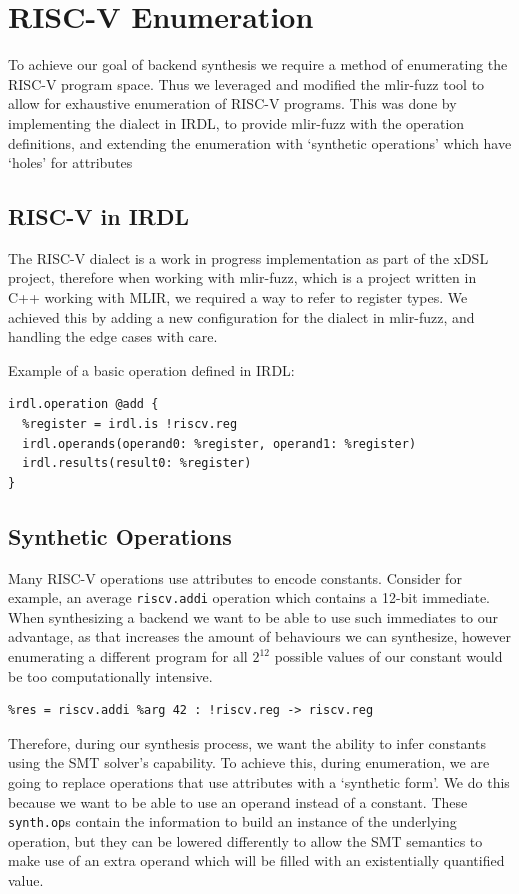 \section{RISC-V Enumeration}

\label{enumeration}

To achieve our goal of backend synthesis we require a method of enumerating the RISC-V program space.
Thus we leveraged and modified the mlir-fuzz tool to allow for exhaustive enumeration of RISC-V programs.
This was done by implementing the dialect in IRDL, to provide mlir-fuzz with the operation definitions, 
and extending the enumeration with `synthetic operations' which have `holes' for attributes

\subsection{RISC-V in IRDL}

The RISC-V dialect is a work in progress implementation as part of the xDSL project, therefore
when working with mlir-fuzz, which is a project written in C++ working with MLIR, we required
a way to refer to register types. We achieved this by adding a new configuration for the dialect 
in mlir-fuzz, and handling the edge cases with care.

Example of a basic operation defined in IRDL:
\begin{verbatim}
irdl.operation @add {
  %register = irdl.is !riscv.reg
  irdl.operands(operand0: %register, operand1: %register)
  irdl.results(result0: %register)
}
\end{verbatim}

\subsection{Synthetic Operations}

Many RISC-V operations use attributes to encode constants. Consider for example, an average \texttt{riscv.addi}
operation which contains a 12-bit immediate. When synthesizing a backend we want to be able to 
use such immediates to our advantage, as that increases the amount of behaviours we can synthesize,
however enumerating a different program for all $2^{12}$ possible values of our constant would be too computationally intensive.

\begin{verbatim}
%res = riscv.addi %arg 42 : !riscv.reg -> riscv.reg
\end{verbatim}
%
Therefore, during our synthesis process, we want the ability to infer constants using the SMT solver's
capability. To achieve this, during enumeration, we are going to replace operations that use attributes 
with a `synthetic form'. We do this because we want to be able to use an operand instead of a constant. 
These \texttt{synth.op}s contain the information to build an instance of the underlying operation, 
but they can be lowered differently to allow the SMT semantics to make use of an extra operand which
will be filled with an existentially quantified value.

